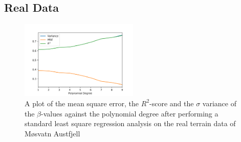 \documentclass[a4paper,10pt,english]{article}
\begin{document}
%






\subsection{Real Data}



\begin{figure}[H]
	\centering 
	\includegraphics[width = 0.5\textwidth, center]{../real_output/part_A.png}
	\caption{
		A plot of the mean square error, the $R^2$-score and the $\sigma$ variance of the $\beta$-values against the polynomial degree after performing a standard least square regression analysis on the real terrain data of Møsvatn Austfjell
	}
	\label{part_g_a}
\end{figure}
\end{document}
